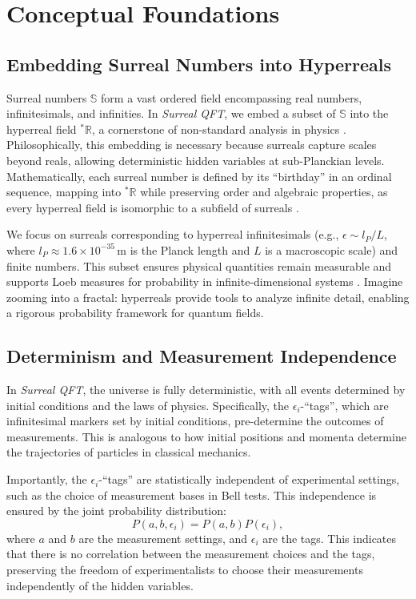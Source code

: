 \documentclass{article}
\begin{document}
\section{Conceptual Foundations}
\subsection{Embedding Surreal Numbers into Hyperreals}
Surreal numbers \(\mathbb{S}\) form a vast ordered field encompassing real numbers, infinitesimals, and infinities. In \textit{Surreal QFT}, we embed a subset of \(\mathbb{S}\) into the hyperreal field \({}^*\mathbb{R}\), a cornerstone of non-standard analysis in physics \cite{Goldblatt1998}. Philosophically, this embedding is necessary because surreals capture scales beyond reals, allowing deterministic hidden variables at sub-Planckian levels. Mathematically, each surreal number is defined by its ``birthday'' in an ordinal sequence, mapping into \({}^*\mathbb{R}\) while preserving order and algebraic properties, as every hyperreal field is isomorphic to a subfield of surreals \cite{Ehrlich2012}.

We focus on surreals corresponding to hyperreal infinitesimals (e.g., \(\epsilon \sim l_P / L\), where \(l_P \approx 1.6 \times 10^{-35} \, \text{m}\) is the Planck length and \(L\) is a macroscopic scale) and finite numbers. This subset ensures physical quantities remain measurable and supports Loeb measures for probability in infinite-dimensional systems \cite{Albeverio1986}. Imagine zooming into a fractal: hyperreals provide tools to analyze infinite detail, enabling a rigorous probability framework for quantum fields.

\subsection{Determinism and Measurement Independence}
In \textit{Surreal QFT}, the universe is fully deterministic, with all events determined by initial conditions and the laws of physics. Specifically, the \(\epsilon_i\)-``tags'', which are infinitesimal markers set by initial conditions, pre-determine the outcomes of measurements. This is analogous to how initial positions and momenta determine the trajectories of particles in classical mechanics.

Importantly, the \(\epsilon_i\)-``tags'' are statistically independent of experimental settings, such as the choice of measurement bases in Bell tests. This independence is ensured by the joint probability distribution:
\begin{equation}
P(a, b, \epsilon_i) = P(a, b) P(\epsilon_i),
\end{equation}
where \(a\) and \(b\) are the measurement settings, and \(\epsilon_i\) are the tags. This indicates that there is no correlation between the measurement choices and the tags, preserving the freedom of experimentalists to choose their measurements independently of the hidden variables.
\end{document}
